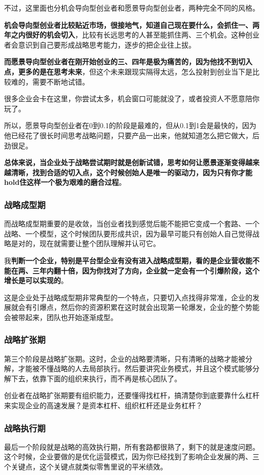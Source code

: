 \documentclass[12pt]{article}
\begin{document}
不过，这里面也分机会导向型创业者和愿景导向型创业者，两种完全不同的风格。

\textbf{机会导向型创业者比较贴近市场，很接地气，知道自己现在要什么，会抓住一、两年之内很好的机会切入}，比较有长远思考的人甚至能抓住两、三个机会。这种创业者会意识到自己要形成战略思考能力，逐步的把企业往上拔。

\textbf{而愿景导向型创业者在刚开始创业的三、四年是极为痛苦的，因为他找不到切入点，更多的是在思考未来}，但这个未来跟现实隔得太远，怎么投射到创业当下是比较难的，需要不断地试错。

很多企业会卡在这里，你尝试太多，机会窗口可能就没了，或者投资人不愿意陪你玩了。

所以，愿景导向型创业者在0到0.1的阶段是最难的，但从0.1到1会是最快的，因为他已经花了很长时间思考战略问题，只要产品一出来，他就知道怎么把它做大，后劲很足。

\textbf{总体来说，当企业处于战略尝试期时就是创新试错，思考如何让愿景逐渐变得越来越清晰，找到合适的切入点，这个时候创始人是唯一的驱动力，因为只有你才能hold住这样一个极为艰难的磨合过程}。

\subsubsection{战略成型期}
而战略成型期重要的是收敛，当创业者找到感觉后能不能把它变成一个套路、一个战略、一个模型，这个时候团队要形成共识，因为最早可能只有创始人自己觉得战略是对的，现在就需要让整个团队理解并认可它。

我\textbf{判断一个企业，特别是平台型企业有没有进入战略成型期，看的是企业营收能不能在两、三年内翻十倍，因为你找对了方向，企业就一定会有一个引爆阶段，这个增长是可以实现的}。

这是企业处于战略成型期非常典型的一个特点，只要切入点找得非常准，企业的发展就会有引爆点，然后你的资源积累在这时就会出现第一轮爆发，企业的整个势能会被带起来，团队也开始逐渐成型。

\subsubsection{战略扩张期}
第三个阶段是战略扩张期。这时，企业的战略要清晰，只有清晰的战略才能被分解，才能被不懂战略的人去局部执行。然后要讲究业务模式，并且这个模式能够分解下去，依靠下面的组织来执行，而不再是核心团队了。

创业者在战略扩张期要有组织能力，还要懂得找杠杆，搞清楚你到底要靠什么杠杆来实现企业的高速发展？是资本杠杆、组织杠杆还是业务杠杆？

\subsubsection{战略执行期}
最后一个阶段就是战略的高效执行期，所有套路都很熟了，剩下的就是速度问题。这个时候，企业要做的是优化运营模式，因为你已经找到了影响企业发展的两、三个关键点，这个关键点就类似零售里说的平米绩效。
\end{document}
